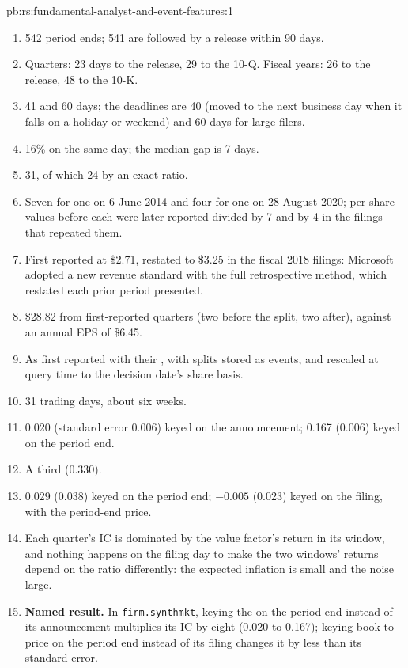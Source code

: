 \begin{solution}{pb:rs:fundamental-analyst-and-event-features:1}
\begin{enumerate}
\item 542 period ends; 541 are followed by a release within 90 days.
\item Quarters: 23 days to the release, 29 to the 10-Q. Fiscal years: 26 to the release, 48 to the 10-K.
\item 41 and 60 days; the deadlines are 40 (moved to the next business day when it falls on a holiday or weekend) and 60 days for large filers.
\item 16\% on the same day; the median gap is 7 days.
\item 31, of which 24 by an exact ratio.
\item Seven-for-one on 6 June 2014 and four-for-one on 28 August 2020; per-share values before each were later reported divided by 7 and by 4 in
the filings that repeated them.
\item First reported at \$2.71, restated to \$3.25 in the fiscal 2018 filings: Microsoft adopted a new revenue standard with the full
retrospective method, which restated each prior period presented.
\item \$28.82 from first-reported quarters (two before the split, two after), against an annual EPS of \$6.45.
\item As first reported with their , with splits stored as events, and rescaled at query time to the decision date's share
basis.
\item 31 trading days, about six weeks.
\item 0.020 (standard error 0.006) keyed on the announcement; 0.167 (0.006) keyed on the period end.
\item A third (0.330).
\item 0.029 (0.038) keyed on the period end; $-0.005$ (0.023) keyed on the filing, with the period-end price.
\item Each quarter's IC is dominated by the value factor's return in its window, and nothing happens on the filing day to make the two windows'
returns depend on the ratio differently: the expected inflation is small and the noise large.
\item \textbf{Named result.} In \texttt{firm.synthmkt}, keying the  on the period end instead of its announcement multiplies
its IC by eight (0.020 to 0.167); keying book-to-price on the period end instead of its filing changes it by less than its standard error.

\end{enumerate}
\end{solution}
